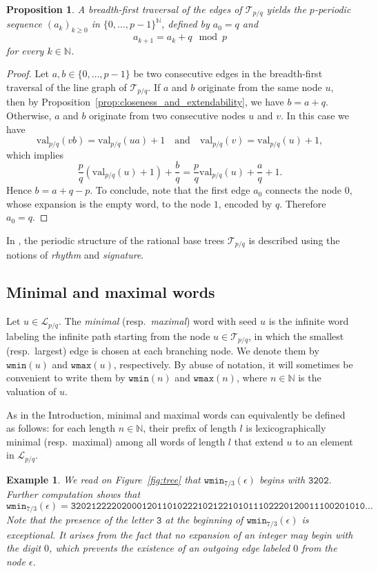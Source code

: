 \documentclass{template_arxiv}
\newtheorem{example}[theorem]{Example}
\newtheorem{proposition}[theorem]{Proposition}
\numberwithin{equation}{section}
\newcommand{\N}{\mathbb N}
\newcommand{\lan}{\mathcal{L}}
\newcommand{\eps}{\epsilon}
\newcommand{\wmax}{\mathtt{wmax}}
\newcommand{\wmin}{\mathtt{wmin}}
\newcommand{\val}{\mathrm{val}}
\newcommand{\tree}{\mathcal{T}} %
\begin{document}
 
\begin{proposition}\label{prop:rythm_signature} A breadth-first traversal \emph{of the edges} of $\tree_{p/q}$ yields the $p$-periodic sequence $(a_k)_{k\geq0}$ in $\{0,\ldots,p-1\}^{\N}$, defined by $a_0=q$ and \[a_{k+1}=a_k+q \mod p\] for every  $k \in \N$.
\end{proposition}

\begin{proof} Let $a, b \in \{0,\ldots,p-1\}$ be two consecutive edges in the breadth-first traversal of the line graph of $\tree_{p/q}$. If $a$ and $b$ originate from the same node $u$, then by Proposition~\ref{prop:closeness_and_extendability}, we have $b = a + q$.
	Otherwise, $a$ and $b$ originate from two consecutive nodes $u$ and $v$. In this case we have
	\[
	\val_{p/q}(vb) = \val_{p/q}(ua) + 1
	\quad \text{and} \quad
	\val_{p/q}(v) = \val_{p/q}(u) + 1,
	\]
	which implies
	\[
	\frac{p}{q}(\val_{p/q}(u)+1) + \frac{b}{q}
	=
	\frac{p}{q}\val_{p/q}(u) + \frac{a}{q} + 1.
	\]
	Hence $b = a + q - p$.
To conclude, note  that the first edge $a_0$ connects the node $0$, whose expansion is the empty word, to the node $1$, encoded by $q$. Therefore $a_0=q$.
\end{proof}

In \cite{MS17}, the periodic structure of the rational base trees $\tree_{p/q}$ is described using the notions of \emph{rhythm} and \emph{signature}.


\subsection{Minimal and maximal words}


Let $u \in \lan_{p/q}$. The \emph{minimal} (resp.\ \emph{maximal}) word with seed $u$ is the infinite word labeling the infinite path starting from the node $u \in \tree_{p/q}$, in which the smallest (resp.\ largest) edge is chosen at each branching node. We denote them by $\wmin(u)$ and $\wmax(u)$, respectively. By abuse of notation, it will sometimes be convenient to write them by $\wmin(n)$ and $\wmax(n)$, where $n \in \mathbb{N}$ is the valuation of $u$.

As in the Introduction, minimal and maximal words can equivalently be defined as follows: for each length $n \in \mathbb{N}$, their prefix of length $l$ is lexicographically minimal (resp.\ maximal) among all words of length $l$ that extend $u$ to an element in $\lan_{p/q}$.


\begin{example}\label{ex:wmin73eps} We read on Figure~\ref{fig:tree} that $\wmin_{7/3}(\eps)$ begins with $\mathtt{3202}$. Further computation shows that
\[\wmin_{7/3}(\eps)=
\mathtt{3202122220200012011010222102122101011102220120011100201010}...\]
Note that the presence of the letter $\mathtt{3}$ at the beginning of $\wmin_{7/3}(\eps)$ is exceptional. It arises from the fact that no expansion of an integer may begin with the digit $0$, which prevents the existence of an outgoing edge labeled $0$ from the node $\eps$.	
\end{example}
\end{document}
